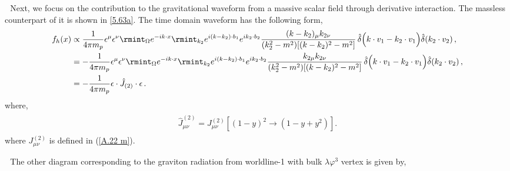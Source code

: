 \textbullet $\,\,$ Next, we focus on the contribution to the gravitational waveform from a massive scalar field through derivative interaction. The massless counterpart of it is shown in \eqref{5.63a}. The time domain waveform has the following form,
\begin{align}
    \begin{split}
          f_{h}(x)&
        \propto\frac{1}{4\pi m_p}\epsilon^\mu \epsilon^\nu \rmint_{\Omega}e^{-ik\cdot x}\rmint_{k_2}e^{i(k-k_2)\cdot b_1}e^{ik_2\cdot b_2}\frac{(k-k_2)_{\mu}k_{2\nu}}{(k_2^2-m^2)[(k-k_2)^2-m^2]}\,\hat\delta\Big(k\cdot v_1-k_2\cdot v_1\Big)\hat\delta(k_2\cdot v_2)\,,\\ &
=-\frac{1}{4\pi m_p}\epsilon^\mu \epsilon^\nu \rmint_{\Omega}e^{-ik\cdot x}\rmint_{k_2}e^{i(k-k_2)\cdot b_1}e^{ik_2\cdot b_2}\frac{k_{2\mu}k_{2\nu}}{(k_2^2-m^2)[(k-k_2)^2-m^2]}\,\hat\delta\Big(k\cdot v_1-k_2\cdot v_1\Big)\hat\delta(k_2\cdot v_2)\,,\\ &
=-\frac{1}{4\pi m_p}\epsilon\cdot \hat J_{(2)}\cdot \epsilon\,.
    \end{split}
\end{align}
where,
\begin{align}
    \begin{split}
        \hat J_{\mu\nu}^{(2)}=J_{\mu\nu}^{(2)}[(1-y)^2\to (1-y+y^2)].
    \end{split}
\end{align}
where $J_{\mu\nu}^{(2)}$ is defined in (\ref{A.22 m}).

\textbullet $\,\,$
The other diagram corresponding to the graviton radiation from worldline-1 with bulk $\lambda \varphi^3$ vertex is given by,

